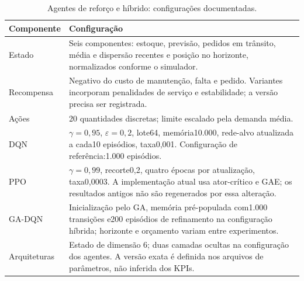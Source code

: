 \begin{table}[htbp]\centering\small
\caption{Agentes de reforço e híbrido: configurações documentadas.}\label{tab:rl_params}
\begin{tabular}{@{}p{3cm}p{11.4cm}@{}}\toprule
\textbf{Componente} & \textbf{Configuração}\\\midrule
Estado & Seis componentes: estoque, previsão, pedidos em trânsito, média e dispersão recentes e posição no horizonte, normalizados conforme o simulador.\\
Recompensa & Negativo do custo de manutenção, falta e pedido. Variantes incorporam penalidades de serviço e estabilidade; a versão precisa ser registrada.\\
Ações & 20 quantidades discretas; limite escalado pela demanda média.\\
DQN & $\gamma=0,95$, $\varepsilon=0,2$, lote64, memória10.000, rede-alvo atualizada a cada10 episódios, taxa0,001. Configuração de referência:1.000 episódios.\\
PPO & $\gamma=0,99$, recorte0,2, quatro épocas por atualização, taxa0,0003. A implementação atual usa ator-crítico e GAE; os resultados antigos não são regenerados por essa alteração.\\
GA-DQN & Inicialização pelo GA, memória pré-populada com1.000 transições e200 episódios de refinamento na configuração híbrida; horizonte e orçamento variam entre experimentos.\\
Arquiteturas & Estado de dimensão 6; duas camadas ocultas na configuração dos agentes. A versão exata é definida nos arquivos de parâmetros, não inferida dos KPIs.\\
\bottomrule\end{tabular}\end{table}

